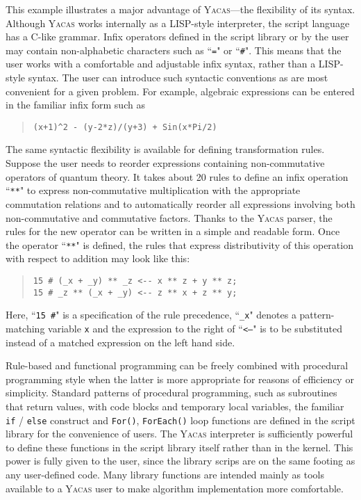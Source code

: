 \documentclass{llncs}
\begin{document}
This example illustrates a major advantage of \textsc{Yacas}---the flexibility of its syntax. Although \textsc{Yacas}
works internally as a LISP-style interpreter,
the script language has a C-like grammar. Infix operators
defined in the script library or by the user may contain non-alphabetic characters such as ``\texttt{=}"
or ``\verb|#|". This means that the user works with a comfortable and adjustable infix syntax,
rather than a LISP-style syntax. The user can introduce such syntactic
conventions as are most convenient for a given problem.
For example, algebraic expressions can be entered
in the familiar infix form such as
%
\begin{quote}\small\begin{verbatim}
(x+1)^2 - (y-2*z)/(y+3) + Sin(x*Pi/2)
\end{verbatim}\end{quote}
%
The same syntactic flexibility is available for defining transformation rules.
Suppose the user needs to reorder expressions containing non-commutative
operators of quantum theory. It takes about 20
rules to define an infix operation ``\texttt{**}"
to express non-commutative multiplication with the appropriate commutation
relations and to automatically reorder all expressions involving both non-commutative and commutative factors. Thanks to the \textsc{Yacas} parser,
the rules for the new operator can be written in a simple and readable form. Once the operator
``\texttt{**}" is defined, the rules that express distributivity of this operation
with respect to addition may look like this:
\begin{quote}\small\begin{verbatim}
15 # (_x + _y) ** _z <-- x ** z + y ** z;
15 # _z ** (_x + _y) <-- z ** x + z ** y;
\end{verbatim}\end{quote}
Here, ``\verb|15 #|" is a specification of the rule precedence, ``\verb|_x|" denotes a
pattern-matching variable \texttt{x} and the expression to the right of ``\texttt{<--}" is to be
substituted instead of a matched expression on the left hand side.

Rule-based and functional programming can be freely combined with procedural
programming style when the latter is more appropriate for reasons of efficiency or simplicity. Standard
patterns of procedural programming, such as subroutines that return values,
with code blocks and temporary local variables, the familiar \texttt{if} /
\texttt{else} construct and \texttt{For()},
\texttt{ForEach()} loop functions are defined in the script library for the
convenience of users. The \textsc{Yacas} interpreter is sufficiently powerful
to define these functions in the script library itself rather than in the
kernel. This power is fully given to the user, since the library scrips are on
the same footing as any user-defined code. Many library functions are intended
mainly as tools available to a \textsc{Yacas} user to make algorithm
implementation more comfortable.
\end{document}
